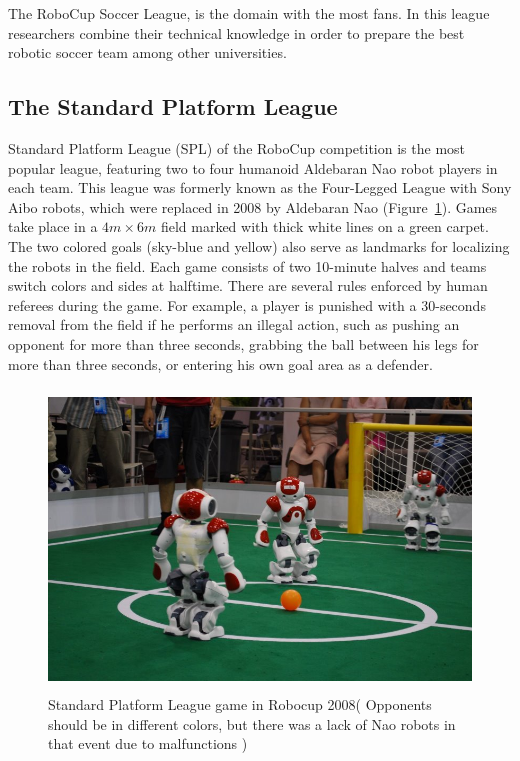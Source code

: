The RoboCup Soccer League, is the domain with the most fans. In this league researchers combine their technical knowledge in order to prepare the best robotic soccer team among other universities.

\subsection{The Standard Platform League}

Standard Platform League (SPL) of the RoboCup competition is the most popular league, featuring two to four humanoid Aldebaran Nao robot players in each team. This league was formerly known as the Four-Legged League with Sony Aibo robots, which were replaced in 2008 by Aldebaran Nao (Figure~\ref{fig:spl}). Games take place in a $4 m \times 6 m$ field marked with thick white lines on a green carpet. The two colored goals (sky-blue and yellow) also serve as landmarks for localizing the robots in the field. Each game consists of two 10-minute halves and teams switch colors and sides at halftime. There are several rules enforced by human referees during the game. For example, a player is punished with a 30-seconds removal from the field if he performs an illegal action, such as pushing an opponent for more than three seconds, grabbing the ball between his legs for more than three seconds, or entering his own goal area as a defender.

\begin{figure}[h]
	\begin{center}
		\includegraphics[height = 8cm]{Chapter1/figures/spl.jpg}
		\caption{Standard Platform League game in Robocup 2008( Opponents should be in different colors, but there was a lack of Nao robots in that event due to malfunctions )}
 		\label{fig:spl}
	\end{center}
\end{figure}


